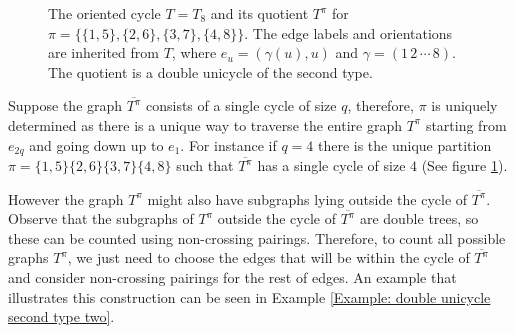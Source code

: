 \documentclass{article}
\theoremstyle{definition}
\begin{document}
{\begin{figure}[htbp]

\caption{
The oriented cycle $T=T_8$ and its quotient $T^\pi$ for
$\pi=\{\{1,5\},\{2,6\},\{3,7\},\{4,8\}\}$.
The edge labels and orientations are inherited from $T$, where
$e_u=(\gamma(u),u)$ and $\gamma=(1\,2\,\cdots\,8)$.
The quotient is a double unicycle of the second type.
}
\label{figure: double unicycle second type}
\end{figure}

Suppose the graph $\overline{T^\pi}$ consists of a single cycle of size $q$, therefore, $\pi$ is uniquely determined as there is a unique way to traverse the entire graph $T^\pi$ starting from $e_{2q}$ and going down up to $e_1$. For instance if $q=4$ there is the unique partition $\pi=\{1,5\}\{2,6\}\{3,7\}\{4,8\}$ such that $\overline{T^\pi}$ has a single cycle of size $4$ (See figure \ref{figure: double unicycle second type}).

However the graph $T^\pi$ might also have subgraphs lying outside the cycle of $\overline{T^\pi}$. Observe that the subgraphs of $T^\pi$ outside the cycle of $\overline{T^\pi}$ are double trees, so these can be counted using non-crossing pairings. Therefore, to count all possible graphs $T^\pi$, we just need to choose the edges that will be within the cycle of $\overline{T^\pi}$ and consider non-crossing pairings for the rest of edges. An example that illustrates this construction can be seen in Example \ref{Example: double unicycle second type two}. 

}
\end{document}
